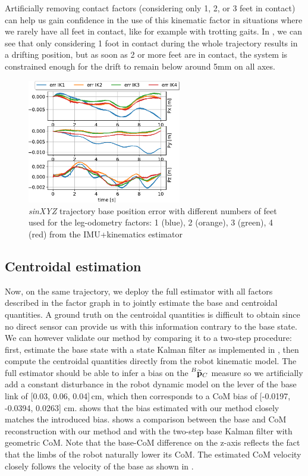 Artificially removing contact factors (considering only 1, 2, or 3 feet in contact) can help us gain confidence in the use of this kinematic factor 
in situations where we rarely have all feet in contact, like for example with trotting gaits. In , we can see that only considering 
1 foot in contact during the whole trajectory results in a drifting position, but as soon as 2 or more feet are in contact, the system is constrained enough 
for the drift to remain below around 5mm on all axes. 
%
\begin{figure}[h]
    \centering
    \includegraphics[width=0.6\textwidth]{figures/centroidal/base_position_err_IKn.pdf}
    \caption{\textit{sinXYZ} trajectory base position error with different numbers of feet used for the leg-odometry factors: 
    1 (blue), 2 (orange), 3 (green), 4 (red) from the IMU+kinematics estimator}
    \label{fig:ErrIKn}
\end{figure}
%

\subsection{Centroidal estimation}

Now, on the same trajectory, we deploy the full estimator with all factors described in the factor graph in  to jointly 
estimate the base and centroidal quantities. A ground truth on the centroidal quantities is difficult to obtain since no direct 
sensor can provide us with this information contrary to the base state. 
We can however validate our method by comparing it to a two-step procedure: first, estimate the base state with a state Kalman filter as 
implemented in \cite{bledt2018cheetah}, then compute the centroidal quantities directly from the robot kinematic model. 
The full estimator should be able to infer a bias on the $\prescript{B}{}{\widetilde{{\bf p}}}_{C}$ measure so we artificially add a constant disturbance 
in the robot dynamic model on the lever of the base link of [0.03, 0.06, 0.04]\,cm, which then corresponds to a CoM bias of 
[-0.0197, -0.0394,  0.0263] cm.  shows that the bias estimated with our method closely matches the introduced bias. 
 shows a comparison between the base and CoM reconstruction with our method and with the two-step base Kalman filter 
with geometric CoM. Note that the base-CoM difference on the z-axis reflects the fact that the limbs of the robot naturally lower its CoM. 
The estimated CoM velocity closely follows the velocity of the base as shown in .


